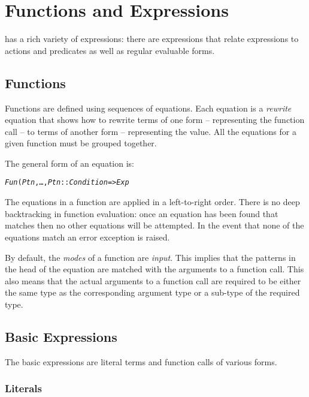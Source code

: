 \chapter{Functions and Expressions}
\label{expressions}

\go has a rich variety of expressions: there are expressions that relate expressions to actions and predicates as well as regular evaluable forms.

\section{Functions}
\label{expression:functions}

Functions are defined using sequences of equations. Each equation is a \emph{rewrite} equation that shows how to rewrite terms of one form -- representing the function call -- to terms of another form -- representing the value.
All the equations for a given function must be grouped together.

The general form of an equation is:
\begin{alltt}
\emph{Fun}(\emph{Ptn},\ldots,\emph{Ptn\subn} :: \emph{Condition} => \emph{Exp}
\end{alltt}
The equations in a function are applied in a left-to-right order. There is no deep backtracking in function evaluation: once an equation has been found that matches then no other equations will be attempted. In the event that none of the equations match an error exception is raised.

By default, the \emph{modes} of a function are \emph{input}. This implies that the patterns in the head of the equation are matched with the arguments to a function call. This also means that the actual arguments to a function call are required to be either the same type as the corresponding argument type or a sub-type of the required type.

\section{Basic Expressions}
\label{expression:atomic}

The basic \go expressions are literal terms and function calls of various forms.

\subsection{Literals}
\label{expression:symbol}

